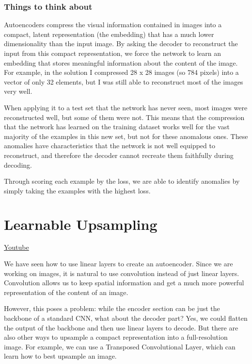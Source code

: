 \subsubsection{Things to think about}

Autoencoders compress the visual information contained in images into a compact, latent representation (the embedding) that has a much lower dimensionality than the input image. By asking the decoder to reconstruct the input from this compact representation, we force the network to learn an embedding that stores meaningful information about the content of the image. For example, in the solution I compressed 28 x 28 images (so 784 pixels) into a vector of only 32 elements, but I was still able to reconstruct most of the images very well. \newline

When applying it to a test set that the network has never seen, most images were reconstructed well, but some of them were not. This means that the compression that the network has learned on the training dataset works well for the vast majority of the examples in this new set, but not for these anomalous ones. These anomalies have characteristics that the network is not well equipped to reconstruct, and therefore the decoder cannot recreate them faithfully during decoding. \newline

Through scoring each example by the loss, we are able to identify anomalies by simply taking the examples with the highest loss.

\section{Learnable Upsampling}
\href{https://www.youtube.com/watch?v=KjztLwPksj8&ab_channel=Udacity}{Youtube} \newline

We have seen how to use linear layers to create an autoencoder. Since we are working on images, it is natural to use convolution instead of just linear layers. Convolution allows us to keep spatial information and get a much more powerful representation of the content of an image. \newline

However, this poses a problem: while the encoder section can be just the backbone of a standard CNN, what about the decoder part? Yes, we could flatten the output of the backbone and then use linear layers to decode. But there are also other ways to upsample a compact representation into a full-resolution image. For example, we can use a Transposed Convolutional Layer, which can learn how to best upsample an image. \newline


